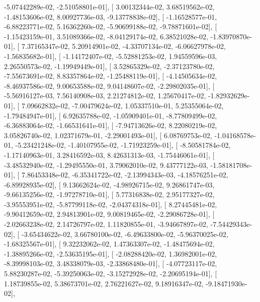 \documentclass{article}
\begin{document}
         -5.07442289e-02,  -2.51058801e-01],
       [  3.00132344e-02,   3.68519562e-02,  -1.48153606e-02,
          8.00927736e-03,  -9.13778838e-02],
       [ -1.16528577e-01,  -6.88223771e-02,   5.16362260e-02,
         -5.90699188e-02,  -9.78871601e-02],
       [ -1.15423159e-01,   3.51089366e-02,  -8.04129174e-02,
          6.38521028e-02,  -1.83970870e-01],
       [  7.37165347e-02,   5.20914901e-02,  -4.33707134e-02,
         -6.06627978e-02,  -1.56835682e-01],
       [ -1.14172407e-02,  -5.52881253e-02,   1.94559596e-03,
          2.26550573e-02,  -1.19949449e-01],
       [  3.52865329e-02,  -2.37123780e-02,  -7.55673691e-02,
          8.83357864e-02,  -1.25488119e-01],
       [ -4.14505634e-02,  -8.46937586e-02,   9.00653588e-02,
          9.04148607e-02,  -2.29802035e-01],
       [ -5.56916127e-03,   7.56140908e-03,   2.21274812e-02,
          1.25670417e-02,  -1.82932629e-01],
       [  7.09662832e-02,  -7.00479624e-02,   1.05337510e-01,
          5.25355064e-02,  -1.79484947e-01],
       [  6.92635788e-02,  -1.05909401e-01,  -8.77809499e-02,
         -6.36883064e-02,  -1.66531641e-01],
       [ -7.94713626e-02,   8.22080219e-02,   3.05826740e-02,
          1.02371679e-01,  -2.29001493e-01],
       [  6.08769753e-02,  -1.04168578e-01,  -5.23421248e-02,
         -1.40107955e-02,  -1.71923259e-01],
       [ -8.50581784e-02,  -1.17140963e-01,   3.28416592e-03,
          8.42631313e-03,  -1.75446061e-01],
       [ -3.48532940e-02,  -1.29495550e-01,   3.79062010e-02,
          9.43777122e-03,  -1.58181708e-01],
       [  7.86453348e-02,  -6.35341722e-02,  -2.13994343e-03,
         -4.18576251e-02,  -6.89928935e-02],
       [  9.13662624e-02,  -4.98926715e-02,   9.26861747e-03,
         -9.66135256e-02,  -1.97278710e-01],
       [  5.77316838e-02,   2.95177327e-02,  -3.95553951e-02,
         -5.87799118e-02,  -2.04374318e-01],
       [  8.27445481e-02,  -9.90412659e-02,   2.94813901e-02,
          9.00819465e-02,  -2.29086728e-01],
       [ -2.02663238e-02,   2.14726797e-02,   1.11820855e-01,
         -3.94667897e-02,  -7.54429343e-02],
       [ -3.65434622e-02,   3.66780100e-02,  -6.49633800e-02,
         -5.96370025e-02,  -1.68325567e-01],
       [  9.32232062e-02,   1.47363307e-02,  -1.48475694e-02,
         -1.38895266e-02,  -2.53635195e-01],
       [ -2.08288420e-02,   1.36982001e-02,  -8.39998103e-02,
          3.48338079e-03,  -2.33868480e-01],
       [ -4.07723117e-02,   5.88230287e-02,  -5.39250063e-02,
         -3.15272928e-02,  -2.20695194e-01],
       [  1.18739855e-02,   5.38673701e-02,   2.76221627e-02,
          9.18916347e-02,  -9.18471930e-02],
\end{document}
